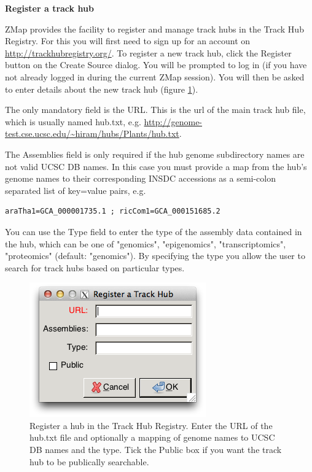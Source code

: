 \documentclass[letterpaper]{article}
\begin{document}
\textbf{Register a track hub}

ZMap provides the facility to register and manage track hubs in the Track Hub Registry. For this you will first need to sign up for an account on \url{http://trackhubregistry.org/}. To register a new track hub, click the Register button on the Create Source dialog. You will be prompted to log in (if you have not already logged in during the current ZMap session). You will then be asked to enter details about the new track hub (figure \ref{img_create_source_trackhub_register}).

The only mandatory field is the URL. This is the url of the main track hub file, which is usually named hub.txt, e.g. \url{http://genome-test.cse.ucsc.edu/~hiram/hubs/Plants/hub.txt}.

The Assemblies field is only required if the hub genome subdirectory names are not valid UCSC DB names. In this case you must provide a map from the hub's genome names to their corresponding INSDC accessions as a semi-colon separated list of key=value pairs, e.g.
\begin{lstlisting}
araTha1=GCA_000001735.1 ; ricCom1=GCA_000151685.2
\end{lstlisting}

You can use the Type field to enter the type of the assembly data contained in the hub, which can be one of "genomics", "epigenomics", "transcriptomics", "proteomics" (default: "genomics"). By specifying the type you allow the user to search for track hubs based on particular types.

\begin{figure}
\centering
\color[rgb]{0.30980393,0.5058824,0.7411765}
\includegraphics[resolution=150]{images/create_source_trackhub_register.png}
\caption{Register a hub in the Track Hub Registry. Enter the URL of the hub.txt file and optionally a mapping of genome names to UCSC DB names and the type. Tick the Public box if you want the track hub to be publically searchable.}
\label{img_create_source_trackhub_register}
\end{figure}
\end{document}
